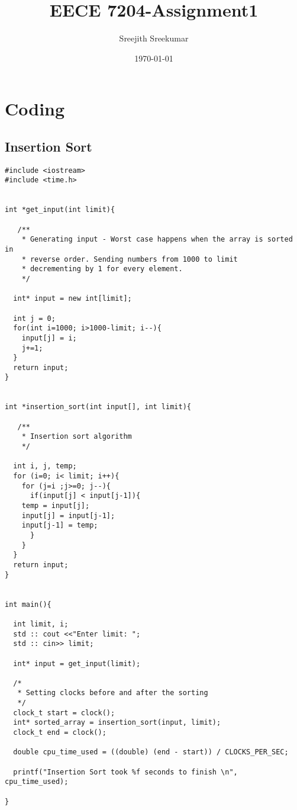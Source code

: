 \documentclass{article}
\title{EECE 7204-Assignment1}
\author{Sreejith Sreekumar}
\date{\today}
\begin{document}
\maketitle
\section{Coding}
\subsection{Insertion Sort}

\begin{verbatim}
#include <iostream>
#include <time.h>


int *get_input(int limit){
  
   /**
    * Generating input - Worst case happens when the array is sorted in
    * reverse order. Sending numbers from 1000 to limit 
    * decrementing by 1 for every element.
    */
    
  int* input = new int[limit];

  int j = 0;
  for(int i=1000; i>1000-limit; i--){
    input[j] = i;
    j+=1;
  }
  return input;
}


int *insertion_sort(int input[], int limit){
  
   /**
    * Insertion sort algorithm
    */
    
  int i, j, temp;
  for (i=0; i< limit; i++){
    for (j=i ;j>=0; j--){
      if(input[j] < input[j-1]){
	temp = input[j];
	input[j] = input[j-1];
	input[j-1] = temp;
      }
    }
  }
  return input;
}


int main(){

  int limit, i;
  std :: cout <<"Enter limit: ";
  std :: cin>> limit;

  int* input = get_input(limit);
  
  /*
   * Setting clocks before and after the sorting
   */
  clock_t start = clock();
  int* sorted_array = insertion_sort(input, limit);
  clock_t end = clock();

  double cpu_time_used = ((double) (end - start)) / CLOCKS_PER_SEC;

  printf("Insertion Sort took %f seconds to finish \n", cpu_time_used);
  
}

\end{verbatim}
\end{document}
